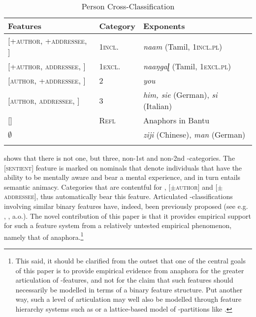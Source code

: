 \documentclass[output=paper, modfonts, nonflat]{langsci/langscibook}
\begin{document}
\begin{table}[h]
	\caption{Person Cross-Classification\label{per1}}
	\begin{tabularx}{\textwidth}{lll}
		\lsptoprule
		Features & Category & Exponents\\\midrule
		{[+\textsc{author}, +\textsc{addressee}, \sentience]} & \textsc{1incl.} & \textit{naam}
		(Tamil, \textsc{1incl.pl})\\
		{[+\textsc{author}, \textminus \textsc{addressee}, \sentience]} &  \textsc{1excl.} &
		\textit{naaŋgaɭ}
		(Tamil, \textsc{1excl.pl})\\
		{[\textminus \textsc{author}, +\textsc{addressee}, \sentience]} & \textsc{2} & \textit{you}\\
		{[\textminus \textsc{author}, \textminus \textsc{addressee}, \sentience]} & \textsc{3} & \textit{him, sie} (German), \textit{si} (Italian)\\
		\midrule
		{[\sentience]} & \textsc{Refl} & Anaphors in Bantu\\
		$\emptyset$ & \nul{} & \textit{ziji} (Chinese),
		\textit{man} (German)\\
		\lspbottomrule
	\end{tabularx}
\end{table}

\noindent   {} shows that there is not one, but three, non-1st and
  non-2nd \person-categories. The [\textsc{sentient}] feature is marked on
  nominals that denote individuals that have the ability to be
  mentally aware and bear a mental experience, and in turn entails
  semantic animacy. Categories that are contentful for \person,
  [$\pm$\textsc{author}] and [$\pm$\textsc{addressee}], thus automatically bear this
  feature.  Articulated \person-classifications involving similar
  binary features have, indeed, been previously proposed (see
  e.g. \citealt{nevins:2007}, \citealt{anag:2005}, a.o.). The novel contribution of this
  paper is that it provides empirical support for such a feature
  system from a relatively untested empirical phenomenon, namely that
  of anaphora.\footnote{This said, it should be clarified from the
    outset that one of the central goals of this paper is to provide
    empirical evidence from anaphora for the greater articulation of
    \person-features, and not for the claim that such features should
    necessarily be modelled in terms of a binary feature
    structure. Put another way, such a level of articulation may well
    also be modelled through feature hierarchy systems such as
    \citet{harleyritter:2002} or a lattice-based model of
    \person-partitions like \citet{harbour:2016}.}
\end{document}
